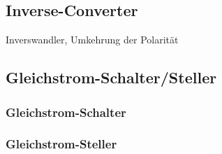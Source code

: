 \subsection{Inverse-Converter}
Inverswandler, Umkehrung der Polarität\newline

\subsection{Gleichstrom-Schalter/Steller}
\subsubsection{Gleichstrom-Schalter}

\subsubsection{Gleichstrom-Steller}
\clearpage